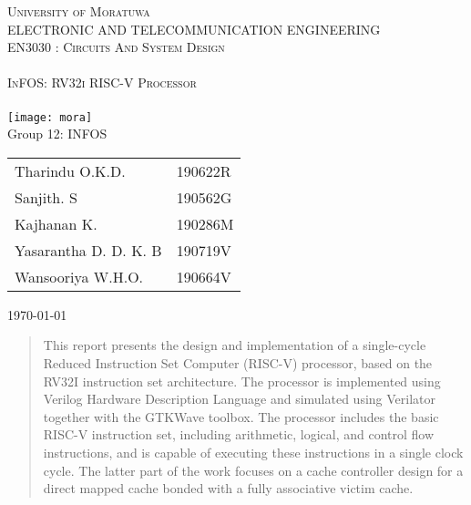 \documentclass[12pt]{article}
\begin{document}
    \begin{titlepage}
        \center
        \vspace*{1cm}
        \textsc{\LARGE University of Moratuwa}\\[.3cm]
        \textsc{\large ELECTRONIC AND TELECOMMUNICATION ENGINEERING}\\[.3cm]
        \textsc{\large EN3030 : Circuits And System Design}\\[1cm]
        \HRule \\[0.4cm]
        { \LARGE \scshape InFOS: RV32i RISC-V Processor  }\\[0.25cm]
        \HRule \\[2cm]
        \texttt{[image: mora]}\\[1.5cm]    %
        {\mdseries Group 12: INFOS}
        \begin{center}
            \begin{tabular}{l l}
                Tharindu O.K.D.       & 190622R \\
                Sanjith. S            & 190562G \\
                Kajhanan K.           & 190286M \\
                Yasarantha D. D. K. B & 190719V \\
                Wansooriya W.H.O.     & 190664V \\
            \end{tabular}
        \end{center}
        {\large \today}\\[.2cm]
        \vfill
        \HRule
    \end{titlepage}

    \tableofcontents
    \vspace*{.5cm}
    \listoffigures
    \vspace*{.5cm}
    \listoftables
    \vfill
    \begin{abstract}
        This report presents the design and implementation of a single-cycle Reduced Instruction Set Computer (RISC-V) processor, based on the RV32I instruction set architecture.
        The processor is implemented using Verilog Hardware Description Language and simulated using Verilator together with the GTKWave toolbox.
        The processor includes the basic RISC-V instruction set, including arithmetic, logical, and control flow instructions, and is capable of executing these instructions in a single clock cycle.
        The latter part of the work focuses on a cache controller design for a direct mapped cache bonded with a fully associative victim cache.
    \end{abstract}
\end{document}
